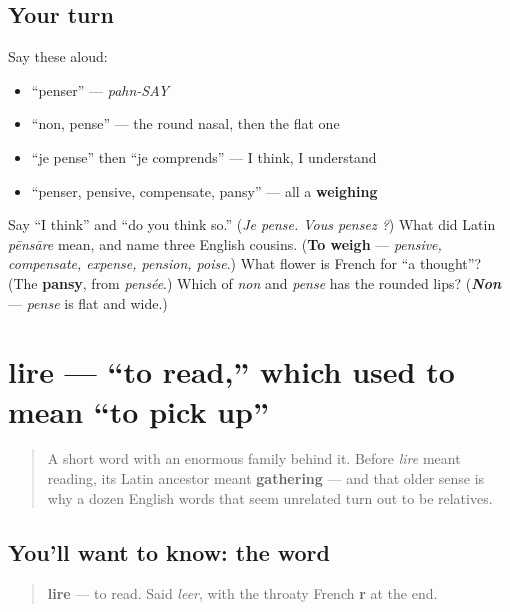 \subsection*{Your turn}
Say these aloud:

\begin{itemize}
\raggedright
  \item \textquotedblleft{}penser\textquotedblright{} — \emph{pahn-SAY}
  \item \textquotedblleft{}non, pense\textquotedblright{} — the round nasal, then the flat one
  \item \textquotedblleft{}je pense\textquotedblright{} then \textquotedblleft{}je comprends\textquotedblright{} — I think, I understand
  \item \textquotedblleft{}penser, pensive, compensate, pansy\textquotedblright{} — all a \textbf{weighing}
\end{itemize}

\begin{tcolorbox}[breakable,colback=teal!4,colframe=teal!35!black,title={Before you move on}]
Say \textquotedblleft{}I think\textquotedblright{} and \textquotedblleft{}do you think so.\textquotedblright{} (\emph{Je pense. Vous pensez ?}) What did Latin \emph{pēnsāre} mean, and name three English cousins. (\textbf{To weigh} — \emph{pensive, compensate, expense, pension, poise}.) What flower is French for \textquotedblleft{}a thought\textquotedblright{}? (The \textbf{pansy}, from \emph{pensée}.) Which of \emph{non} and \emph{pense} has the rounded lips? (\emph{\textbf{Non}} — \emph{pense} is flat and wide.)
\end{tcolorbox}
\section[lire]{lire — \textquotedblleft{}to read,\textquotedblright{} which used to mean \textquotedblleft{}to pick up\textquotedblright{}}

\label{lesson:FR-C25-lire}



\begin{quote}
A short word with an enormous family behind it. Before \emph{lire} meant reading, its Latin ancestor meant \textbf{gathering} — and that older sense is why a dozen English words that seem unrelated turn out to be relatives.
\end{quote}

\subsection*{You'll want to know: the word}
\begin{quote}
\textbf{lire} — to read. Said \emph{leer}, with the throaty French \textbf{r} at the end.
\end{quote}

